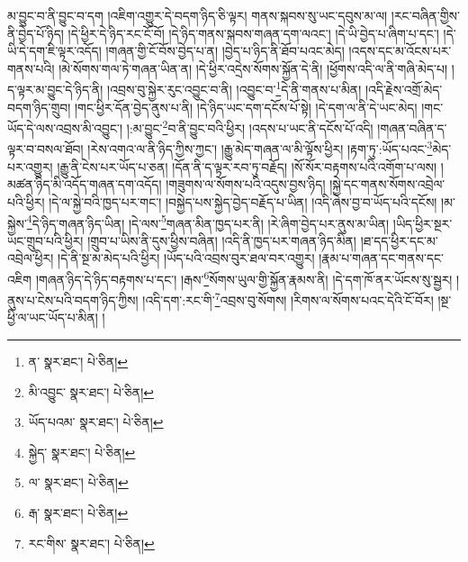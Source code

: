 མ་བྱུང་བ་ནི་བྱུང་བ་དག །འཇིག་འགྱུར་དེ་བདག་ཉིད་ཅི་ལྟར། གནས་སྐབས་སུ་ཡང་དབུས་མ་ལ། །རང་བཞིན་གྱིས་ནི་བྱེད་པོ་ཉིད། །དེ་ཕྱིར་དེ་ཉིད་རང་ངོ་བོ། །དེ་ཉིད་གནས་སྐབས་གཞན་དག་ལའང་། །དེ་ཡི་བྱེད་པ་ཞིག་པ་དང་། །དེ་ཡི་དེ་དག་ཇི་ལྟར་འདོད། །གཞན་གྱི་ངོ་བོས་བྱེད་པ་ན། །བྱེད་པ་ཉིད་ནི་ཐོབ་པའང་མེད། །འདས་དང་མ་འོངས་པར་གནས་པའི། །མེ་སོགས་གལ་ཏེ་གཞན་ཡིན་ན། །དེ་ཕྱིར་འདྲེས་སོགས་སྐྱོན་དེ་ནི། །ཕྱོགས་འདི་ལ་ནི་གཞི་མེད་པ། །ད་ལྟར་མ་བྱུང་དེ་ཉིད་ནི། །འབྲས་བུ་སྐྱེར་རུང་འབྱུང་བ་ནི། །འབྱུང་བ་\footnote{ན་  སྣར་ཐང་།  པེ་ཅིན། }དེ་ནི་གནས་པ་མིན། །འདི་རྗེས་འགྲོ་མེད་བདག་ཉིད་གྲུབ། །གང་ཕྱིར་དོན་བྱེད་ནུས་པ་ནི། །དེ་ཉིད་ཡང་དག་དངོས་པོ་སྟེ། །དེ་དག་ལ་ནི་དེ་ཡང་མེད། །གང་ཡོད་དེ་ལས་འབྲས་མི་འབྱུང་། །:མ་བྱུང་\footnote{མི་འབྱུང་  སྣར་ཐང་།  པེ་ཅིན། }བ་ནི་བྱུང་བའི་ཕྱིར། །འདས་པ་ཡང་ནི་དངོས་པོ་འདི། །གཞན་བཞིན་ད་ལྟར་བ་བསལ་ཐོབ། །རེས་འགའ་ལ་ནི་ཉིད་ཀྱིས་ཀྱང་། །རྒྱུ་མེད་གཞན་ལ་མི་ལྟོས་ཕྱིར། །རྟག་ཏུ་:ཡོད་པའང་\footnote{ཡོད་པའམ་  སྣར་ཐང་།  པེ་ཅིན། }མེད་པར་འགྱུར། །རྒྱུ་ནི་ངེས་པར་ཡོད་པ་ཅན། །དོན་ནི་ད་ལྟར་རབ་ཏུ་བརྗོད། །སོ་སོར་བརྟགས་པའི་འགོག་པ་ལས། །མཚན་ཉིད་མི་འདོད་གཞན་དག་འདོད། །གཟུགས་ལ་སོགས་པའི་འདུས་བྱས་ཉིད། །སྐྱེ་དང་གནས་སོགས་འབྲེལ་པའི་ཕྱིར། །དེ་ལ་སྐྱེ་བའི་ཁྱད་པར་གང་། །བསྐྱེད་པས་སྐྱེད་བྱེད་བརྗོད་པ་ཡིན། །འདི་ཞེས་བྱ་བ་ཡོད་པའི་དངོས། །མ་སྐྱེས་\footnote{སྐྱེད་  སྣར་ཐང་།  པེ་ཅིན། }དེ་ཉིད་གཞན་ཉིད་ཡིན། །དེ་ལས་\footnote{ལ་  སྣར་ཐང་།  པེ་ཅིན། }གཞན་མིན་ཁྱད་པར་ནི། །རེ་ཞིག་བྱེད་པར་ནུས་མ་ཡིན། །ཡིད་ཕྱིར་སྔར་ཡང་གྲུབ་པའི་ཕྱིར། །གྲུབ་པ་ཡིས་ནི་དུས་ཕྱིས་བཞིན། །འདི་ནི་ཁྱད་པར་གཞན་ཉིད་མིན། །ཐ་དད་ཕྱིར་དང་མ་འབྲེལ་ཕྱིར། །དེ་ནི་སྔ་མ་མེད་པའི་ཕྱིར། །ཡོད་པའི་འབྲས་བུར་ཐལ་བར་འགྱུར། །རྣམ་པ་གཞན་དང་གནས་དང་འཇིག །གཞན་ཉིད་དེ་ཉིད་བརྟགས་པ་དང་། །རྒས་\footnote{རྒ་  སྣར་ཐང་།  པེ་ཅིན། }སོགས་ཡུལ་གྱི་སྐྱོན་རྣམས་ནི། །དེ་དག་ཁོ་ནར་ཡོངས་སུ་སྦྱར། །ནུས་པ་ངེས་པའི་བདག་ཉིད་ཀྱིས། །འདི་དག་:རང་གི་\footnote{རང་གིས་  སྣར་ཐང་།  པེ་ཅིན། }འབྲས་བུ་སོགས། །རིགས་ལ་སོགས་པའང་དེའི་ངོ་བོར། །སྔ་ཕྱི་ལ་ཡང་ཡོད་པ་མིན། །
